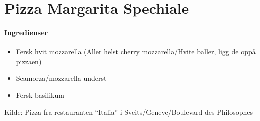 \section{Pizza Margarita Spechiale}


\paragraph{Ingredienser}
\begin{itemize}[noitemsep]
	\item Fersk hvit mozzarella (Aller helst cherry mozzarella/Hvite baller, ligg de oppå pizzaen)
	\item Scamorza/mozzarella underst
	\item Fersk basilikum
\end{itemize}


Kilde: Pizza fra restauranten “Italia” i Sveits/Geneve/Boulevard des Philosophes
